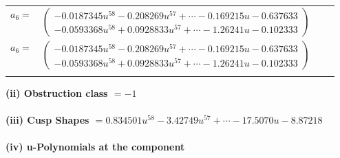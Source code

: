 \documentclass[1p]{elsarticle_modified}
\theoremstyle{definition}
\begin{document}
\begin{tabular}{m{7pt} m{180pt} m{7pt} m{180pt} }
\flushright $a_{6}=$&$\begin{pmatrix}-0.0187345 u^{58}-0.208269 u^{57}+\cdots-0.169215 u-0.637633\\-0.0593368 u^{58}+0.0928833 u^{57}+\cdots-1.26241 u-0.102333\end{pmatrix}$\\ \flushright $a_{6}=$&$\begin{pmatrix}-0.0187345 u^{58}-0.208269 u^{57}+\cdots-0.169215 u-0.637633\\-0.0593368 u^{58}+0.0928833 u^{57}+\cdots-1.26241 u-0.102333\end{pmatrix}$\\&\end{tabular}
\flushleft \textbf{(ii) Obstruction class $= -1$}\\~\\
\flushleft \textbf{(iii) Cusp Shapes $= 0.834501 u^{58}-3.42749 u^{57}+\cdots-17.5070 u-8.87218$}\\~\\
\newpage\renewcommand{\arraystretch}{1}
\flushleft \textbf{(iv) u-Polynomials at the component}\newline \\
\end{document}
